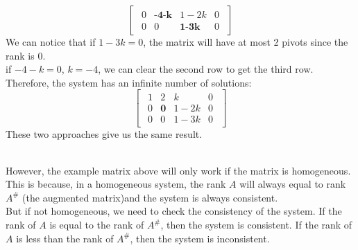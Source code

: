 \documentclass[oneside]{book}
\begin{document}
{\[\begin{bmatrix}
\begin{array}{ccc|c}
                0 & \textbf{-4-k} & 1-2k & 0\\
                0 & 0 & \textbf{1-3k} & 0
            \end{array}
        \end{bmatrix}
    \]
    We can notice that if $1-3k = 0$, the matrix will have at most 2 pivots since the rank is 0. \\
    if $-4-k = 0$, $k = -4$, we can clear the second row to get the third row. Therefore, the system has an infinite number of solutions:\\ 
    \[
        \begin{bmatrix}
            \begin{array}{ccc|c}
                1& 2 & k & 0\\
                0 & \textbf{0}& 1-2k & 0\\
                0 & 0 & 1-3k & 0
            \end{array}
        \end{bmatrix}
    \]
    These two approaches give us the same result. 

}
\\ 
However, the example matrix above will only work if the matrix is homogeneous.  \\

This is because, in a homogeneous system, the rank $A$ will always equal to rank $A^{\#}$ (the augmented matrix)and the system is always consistent.\\

But if not homogeneous, we need to check the consistency of the system. If the rank of $A$ is equal to the rank of $A^{\#}$, then the system is consistent. If the rank of $A$ is less than the rank of $A^{\#}$, then the system is inconsistent.\\
\end{document}
